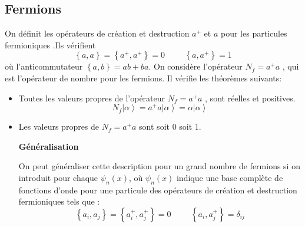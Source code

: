 \documentclass[12pt,a4paper, openany]{report}
\begin{document}
\begin{flushleft}
\begin{itemize}
\begin{flushleft}
\begin{itemize}
\end{itemize}
\setlength\parindent{0mm}
\end{flushleft}

\subsection{Fermions}
\par On définit les opérateurs de création et destruction $a^{+}$ et $a$ pour les particules fermioniques .Ils vérifient 
\begin{equation}
	\left\{a,a\right\}=\left\{a^+,a^+\right\}=0 \hspace{1cm} \left\{a, a^+\right\}=1
\end{equation} où l'anticommutateur $\left\{a,b\right\}=ab+ba $. On considère l'opérateur $N_{f}=a^{+}a$ , qui est l'opérateur de nombre pour les fermions. Il vérifie les théorèmes suivants:
\begin{flushleft}
	\setlength\parindent{3mm}
	\begin{itemize}
	\item Toutes  les valeurs propres de l'opérateur $N_{f}=a^{+}a$ , sont réelles et positives.
\begin{equation}
	N_{f}\left|\alpha\right\rangle=a^{+}a\left|\alpha\right\rangle=\alpha\left|\alpha\right\rangle
\end{equation} 
	\item Les valeurs propres de $N_{f}=a^{+}a$\hspace{0.2cm} sont soit 0 soit 1. \par 
\textbf{Généralisation} \par On peut généraliser cette description pour un grand nombre de fermions si on introduit pour chaque $\psi_n(x)$, où  $\psi_n(x)$ indique une base complète de fonctions d’onde pour une particule des opérateurs de création et destruction fermioniques tels que :
\begin{equation}
	\left\{a_i,a_j\right\}=\left\{a_i^{+},a_j^{+}\right\}=0 \hspace{1cm} \left\{a_i,a_j^{+}\right\}=\delta_{ij}
\end{equation}


\end{itemize}
\end{flushleft}
\end{itemize}
\end{flushleft}
\end{document}
